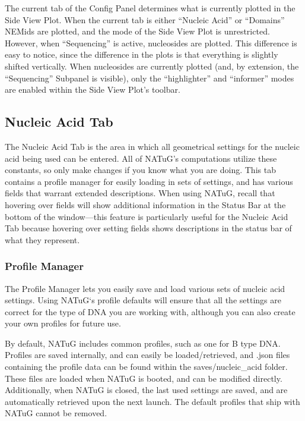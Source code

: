 \documentclass[titlepage]{article}
\begin{document}
The current tab of the Config Panel determines what is currently plotted in the Side View Plot. When the current tab is either ``Nucleic Acid'' or ``Domains'' NEMids are plotted, and the mode of the Side View Plot is unrestricted. However, when ``Sequencing'' is active, nucleosides are plotted. This difference is easy to notice, since the difference in the plots is that everything is slightly shifted vertically. When nucleosides are currently plotted (and, by extension, the ``Sequencing'' Subpanel is visible), only the ``highlighter'' and ``informer'' modes are enabled within the Side View Plot's toolbar.

\subsection{Nucleic Acid Tab} \label{sect:nucleic-acid-tab}

The Nucleic Acid Tab is the area in which all geometrical settings for the nucleic acid being used can be entered. All of NATuG's computations utilize these constants, so only make changes if you know what you are doing. This tab contains a profile manager for easily loading in sets of settings, and has various fields that warrant extended descriptions. When using NATuG, recall that hovering over fields will show additional information in the Status Bar at the bottom of the window---this feature is particularly useful for the Nucleic Acid Tab because hovering over setting fields shows descriptions in the status bar of what they represent.

\subsubsection{Profile Manager}

The Profile Manager lets you easily save and load various sets of nucleic acid settings. Using NATuG`s profile defaults will ensure that all the settings are correct for the type of DNA you are working with, although you can also create your own profiles for future use.

By default, NATuG includes common profiles, such as one for B type DNA. Profiles are saved internally, and can easily be loaded/retrieved, and .json files containing the profile data can be found within the saves/nucleic\_acid folder. These files are loaded when NATuG is booted, and can be modified directly. Additionally, when NATuG is closed, the last used settings are saved, and are automatically retrieved upon the next launch. The default profiles that ship with NATuG cannot be removed.
\end{document}
